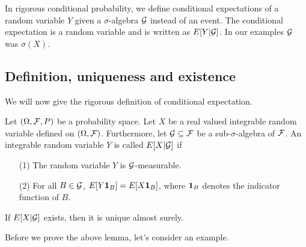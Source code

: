 In rigorous conditional probability, we define conditional expectations of a random variable $Y$ given a $\sigma$-algebra ${\mathcal{G}}$ instead of an event. The conditional expectation is a random variable and is written as $E[Y|{\mathcal{G}}]$. In our examples ${\mathcal{G}}$ was $\sigma(X)$.

\subsection{Definition, uniqueness and existence}
We will now give the rigorous definition of conditional expectation.
\begin{definition}
    Let $({{\Omega}},{\mathcal{F}},P)$ be a probability space. Let $X$ be a real valued integrable random variable defined on $({{\Omega}},{\mathcal{F}})$. Furthermore, let ${\mathcal{G}} \subseteq {\mathcal{F}}$ be a sub-$\sigma$-algebra of ${\mathcal{F}}$. An integrable random variable $Y$ is called $E[X|{\mathcal{G}}]$ if
    \begin{enumerate}
        \item[(1)] The random variable $Y$ is ${\mathcal{G}}$-measurable.
        \item[(2)] For all $B \in {\mathcal{G}}$, $E[Y{{\bf 1}}_B]=E[X{{\bf 1}}_B ]$, where ${{\bf 1}}_B$ denotes the indicator function of $B$.  
    \end{enumerate}
\end{definition}
\begin{lemma}\label{uniqueness-lemma}
    If $E[X|{\mathcal{G}}]$ exists, then it is unique almost surely.
\end{lemma}
Before we prove the above lemma, let's consider an example.
